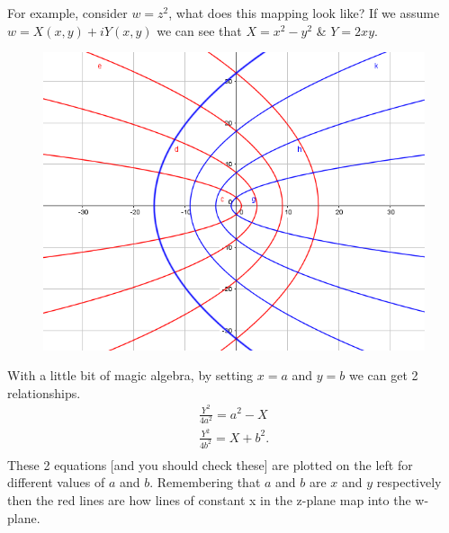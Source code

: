  For example, consider $w=z^2$, what does this mapping look like?
 If we assume $w=X(x,y)+iY(x,y)$ we can see that $X=x^2-y^2$ \& $Y=2xy$.
%
\begin{minipage}[t]{0.47\linewidth}
	\begin{figure}[H]
		\centering
		\includegraphics[width=\linewidth]{complex/mapping}
		\captionsetup{font=small} 	
	\end{figure} 
\end{minipage}
\hspace{0.6cm}
%
\begin{minipage}[t]{0.47\linewidth}
	\vspace{0.3cm}
	With a little bit of magic algebra, by setting $x=a$ and $y=b$ we can get 2 relationships.
	\begin{align*}
	\frac{Y^2}{4a^2}=a^2-X \\
	\frac{Y^2}{4b^2}=X+b^2. \\
	\end{align*}
These 2 equations [and you should check these] are plotted on the left for different values of $a$ and $b$.
 Remembering that $a$ and $b$ are $x$ and $y$ respectively then the red lines are how lines of constant x in the z-plane map into the w-plane.
\end{minipage}
%
%
